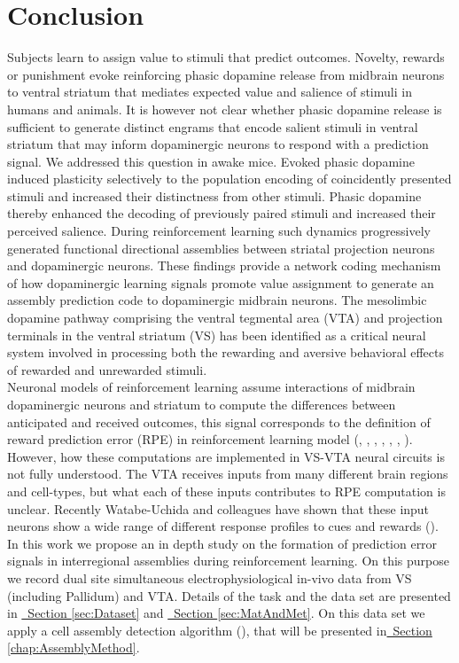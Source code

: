 \chapter{Conclusion}
\label{chap:Conclusion}
{\color{red}Subjects learn to assign value to stimuli that predict outcomes. Novelty, rewards or punishment evoke reinforcing phasic dopamine release from midbrain neurons to ventral striatum that mediates expected value and salience of stimuli in humans and animals. It is however not clear whether phasic dopamine release is sufficient to generate distinct engrams that encode salient stimuli in ventral striatum that may inform dopaminergic neurons to respond with a prediction signal. We addressed this question in awake mice. Evoked phasic dopamine induced plasticity selectively to the population encoding of coincidently presented stimuli and increased their distinctness from other stimuli. Phasic dopamine thereby enhanced the decoding of previously paired stimuli and increased their perceived salience. 
During reinforcement learning such dynamics progressively generated functional directional assemblies between striatal projection neurons and dopaminergic neurons. These findings provide a network coding mechanism of how dopaminergic learning signals promote value assignment to generate an assembly prediction code to dopaminergic midbrain neurons.
The mesolimbic dopamine pathway comprising the ventral tegmental area (VTA) and projection terminals in the ventral striatum (VS) has been identified as a critical neural system involved in processing both the rewarding and aversive behavioral effects of rewarded and unrewarded stimuli.\\Neuronal models of reinforcement learning assume interactions of midbrain dopaminergic neurons and striatum to compute the differences between anticipated and received outcomes, this signal corresponds to the definition of reward prediction error (RPE) in reinforcement learning model (\cite{Schultz2001}, \cite{Schultz2002}, \cite{Fiorillo}, \cite{Eshel1}, \cite{Pagnoni}, \cite{Radua}, \cite{Takahashi2016}). However, how these computations are implemented in VS-VTA neural circuits is not fully understood. The VTA receives inputs from many different brain regions and cell-types, but what each of these inputs contributes to RPE computation is unclear. Recently Watabe-Uchida and colleagues have shown that these input neurons show a wide range of different response profiles to cues and rewards (\cite{TianHuang}).\\In this work we propose an in depth study on the formation of prediction error signals in interregional assemblies during reinforcement learning. On this purpose we record dual site simultaneous electrophysiological in-vivo data from VS (including Pallidum) and VTA. Details of the task and the data set are presented in \hyperref[sec:Dataset]{~Section \ref*{sec:Dataset}} and \hyperref[sec:MatAndMet]{~Section \ref*{sec:MatAndMet}}. On this data set we apply a cell assembly detection algorithm (\cite{RussoDurstewitz}), that will be presented in\hyperref[chap:AssemblyMethod]{~Section \ref*{chap:AssemblyMethod}}.
}
